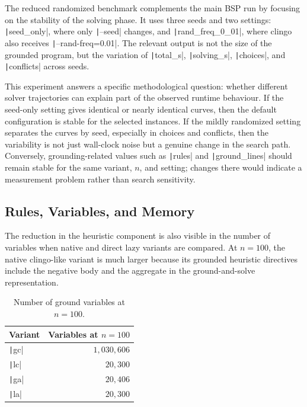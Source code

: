 The reduced randomized benchmark complements the main BSP run by focusing on the stability of the solving phase. It uses three seeds and two settings: \texttt|seed_only|, where only \texttt|--seed| changes, and \texttt|rand_freq_0_01|, where clingo also receives \texttt|--rand-freq=0.01|. The relevant output is not the size of the grounded program, but the variation of \texttt|total_s|, \texttt|solving_s|, \texttt|choices|, and \texttt|conflicts| across seeds.

This experiment answers a specific methodological question: whether different solver trajectories can explain part of the observed runtime behaviour. If the seed-only setting gives identical or nearly identical curves, then the default configuration is stable for the selected instances. If the mildly randomized setting separates the curves by seed, especially in choices and conflicts, then the variability is not just wall-clock noise but a genuine change in the search path. Conversely, grounding-related values such as \texttt|rules| and \texttt|ground_lines| should remain stable for the same variant, $n$, and setting; changes there would indicate a measurement problem rather than search sensitivity.

\subsection{Rules, Variables, and Memory}

The reduction in the heuristic component is also visible in the number of variables when native and direct lazy variants are compared. At $n=100$, the native clingo-like variant is much larger because its grounded heuristic directives include the negative body and the aggregate in the ground-and-solve representation.

\begin{table}[H]
\centering
\begin{tabular}{lr}
\toprule
\textbf{Variant} & \textbf{Variables at $n=100$}\\
\midrule
\texttt|gc| & $1{,}030{,}606$\\
\texttt|lc| & $20{,}300$\\
\texttt|ga| & $20{,}406$\\
\texttt|la| & $20{,}300$\\
\bottomrule
\end{tabular}
\caption{Number of ground variables at $n=100$.}
\label{tab:n100-vars}
\end{table}

